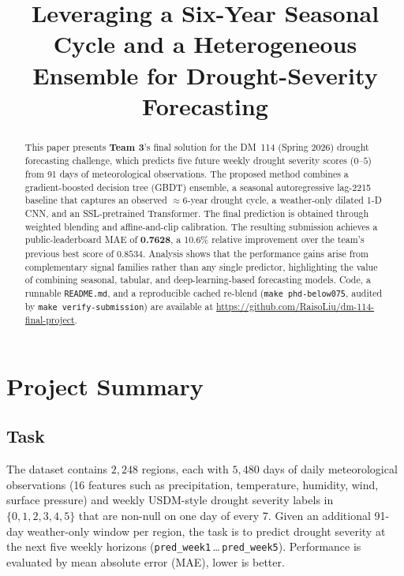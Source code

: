 \documentclass[conference,10pt,a4paper]{IEEEtran}
\begin{document}
\raggedbottom

\title{Leveraging a Six-Year Seasonal Cycle and a Heterogeneous Ensemble for Drought-Severity Forecasting}

\author{
}

\maketitle
\thispagestyle{plain}
\pagestyle{plain}

\begin{abstract}
This paper presents \textbf{Team 3}'s final solution for the DM~114 (Spring 2026) drought forecasting challenge, which predicts five future weekly drought severity scores ($0$--$5$) from 91 days of meteorological observations. The proposed method combines a gradient-boosted decision tree (GBDT) ensemble, a seasonal autoregressive lag-2215 baseline that captures an observed $\approx$6-year drought cycle, a weather-only dilated 1-D CNN, and an SSL-pretrained Transformer. The final prediction is obtained through weighted blending and affine-and-clip calibration. The resulting submission achieves a public-leaderboard MAE of \textbf{0.7628}, a 10.6\% relative improvement over the team's previous best score of $0.8534$. Analysis shows that the performance gains arise from complementary signal families rather than any single predictor, highlighting the value of combining seasonal, tabular, and deep-learning-based forecasting models. Code, a runnable \texttt{README.md}, and a reproducible cached re-blend (\texttt{make phd-below075}, audited by \texttt{make verify-submission}) are available at \url{https://github.com/RaisoLiu/dm-114-final-project}.
\end{abstract}

\section{Project Summary}

\subsection{Task}
The dataset contains $2{,}248$ regions, each with $5{,}480$ days of daily meteorological observations (16 features such as precipitation, temperature, humidity, wind, surface pressure) and weekly USDM-style drought severity labels in $\{0,1,2,3,4,5\}$ that are non-null on one day of every 7. Given an additional 91-day weather-only window per region, the task is to predict drought severity at the next five weekly horizons (\texttt{pred\_week1}\,\ldots\,\texttt{pred\_week5}). Performance is evaluated by mean absolute error (MAE), lower is better.
\end{document}
